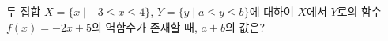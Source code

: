 두 집합 $X=\{x \mid -3\le x\le 4\}$, $Y=\{y \mid a\le y\le b\}$에 대하여 $X$에서 $Y$로의 함수 $f(x)=-2x+5$의 역함수가 존재할 때, $a+b$의 값은?
